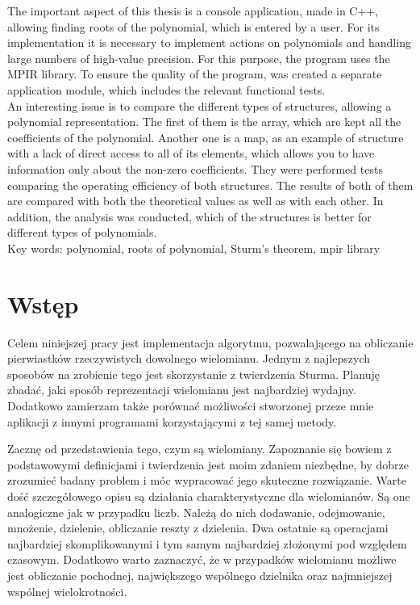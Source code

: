 \documentclass[twoside,a4paper]{book}
\begin{document}
The important aspect of this thesis is a console application, made in C++, allowing finding roots of the polynomial, which is entered by a user. For its implementation it is necessary to implement actions on polynomials and handling large numbers of high-value precision. For this purpose, the program uses the MPIR library. To ensure the quality of the program, was created a separate application module, which includes the relevant functional tests. \\

An interesting issue is to compare the different types of structures, allowing a polynomial representation. The first of them is the array, which are kept all the coefficients of the polynomial. Another one is a map, as an example of structure with a lack of direct access to all of its elements, which allows you to have information only about the non-zero coefficients. They were performed tests comparing the operating efficiency of both structures. The results of both of them are compared with both the theoretical values as well as with each other. In addition, the analysis was conducted, which of the structures is better for different types of polynomials. \\

Key words: polynomial, roots of polynomial, Sturm’s theorem, mpir library

\tableofcontents

\mainmatter

\chapter{Wstęp}

Celem niniejszej pracy jest implementacja algorytmu, pozwalającego na obliczanie pierwiastków rzeczywistych dowolnego wielomianu. Jednym z najlepszych sposobów na zrobienie tego jest skorzystanie z twierdzenia Sturma. Planuję zbadać, jaki sposób reprezentacji wielomianu jest najbardziej wydajny. Dodatkowo zamierzam także porównać możliwości stworzonej przeze mnie aplikacji z innymi programami korzystającymi z tej samej metody.

Zacznę od przedstawienia tego, czym są wielomiany. Zapoznanie się bowiem z podstawowymi definicjami i twierdzenia jest moim zdaniem niezbędne, by dobrze zrozumieć badany problem i móc wypracować jego skuteczne rozwiązanie. Warte dość szczegółowego opisu są działania charakterystyczne dla wielomianów. Są one analogiczne jak w przypadku liczb. Należą do nich dodawanie, odejmowanie, mnożenie, dzielenie, obliczanie reszty z dzielenia. Dwa ostatnie są operacjami najbardziej skomplikowanymi i tym samym najbardziej złożonymi pod względem czasowym. Dodatkowo warto zaznaczyć, że w przypadków wielomianu możliwe jest obliczanie pochodnej, największego wspólnego dzielnika oraz najmniejszej wspólnej wielokrotności.
\end{document}
